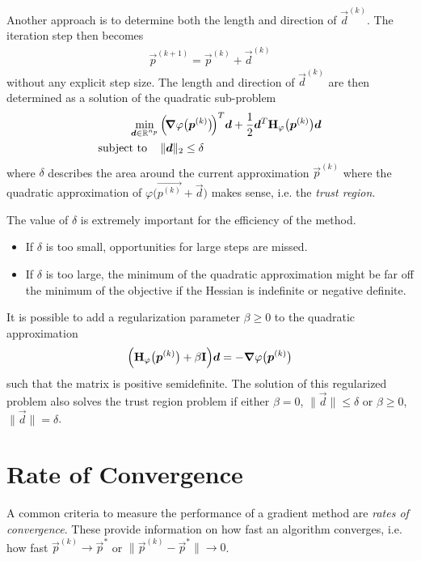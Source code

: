 		Another approach is to determine both the length and direction of \( \vec{d}^{(k)} \). The iteration step then becomes
		\begin{align*}
			\vec{p}^{(k + 1)} = \vec{p}^{(k)} + \vec{d}^{(k)}
		\end{align*}
		without any explicit step size. The length and direction of \( \vec{d}^{(k)} \) are then determined as a solution of the quadratic sub-problem
		\begin{align*}
			\min_{\bm{d} \in \mathbb{R}^{n_p}} & \, \Big(\! \grad{\varphi}\big(\bm{p}^{(k)}\big) \!\Big)^T \bm{d} + \frac{1}{2} \bm{d}^T \bm{\mathrm{H}}_\varphi\big(\bm{p}^{(k)}\big) \bm{d} \\
			\mathrm{subject~to}\quad    & \,
			\begin{alignedat}[t]{2}
				\lVert \bm{d} \rVert_2 & \leq \delta
			\end{alignedat}
		\end{align*}
		where \(\delta\) describes the area around the current approximation \( \vec{p}^{(k)} \) where the quadratic approximation of \( \varphi\big(\vec{p^{(k)}} + \vec{d}\big) \) makes sense, i.e. the \emph{trust region}.

		The value of \(\delta\) is extremely important for the efficiency of the method.
		\begin{itemize}
			\item If \(\delta\) is too small, opportunities for large steps are missed.
			\item If \(\delta\) is too large, the minimum of the quadratic approximation might be far off the minimum of the objective if the Hessian is indefinite or negative definite.
		\end{itemize}
		It is possible to add a regularization parameter \(\beta \geq 0\) to the quadratic approximation
		\begin{align*}
			\Big( \bm{\mathrm{H}}_\varphi\big(\bm{p}^{(k)}\big) + \beta \bm{\mathrm{I}} \Big) \bm{d} = -\grad{\varphi}\big(\bm{p}^{(k)}\big)
		\end{align*}
		such that the matrix is positive semidefinite. The solution of this regularized problem also solves the trust region problem if either \( \beta = 0 \), \( \lVert \vec{d} \rVert \leq \delta \) or \( \beta \geq 0 \), \( \lVert \vec{d} \rVert = \delta \).

	\section{Rate of Convergence}
		A common criteria to measure the performance of a gradient method are \emph{rates of convergence}. These provide information on how fast an algorithm converges, i.e. how fast \( \vec{p}^{(k)} \to \vec{p}^\ast \) or \( \big\lVert \vec{p}^{(k)} - \vec{p}^\ast \big\rVert \to 0 \).

